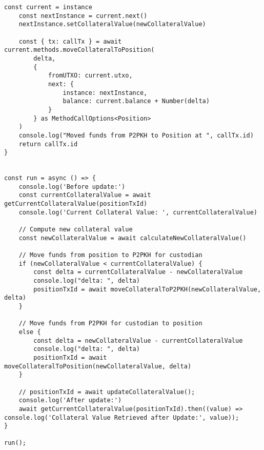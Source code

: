 \begin{lstlisting}[style=htmlcssjs, caption=Moving funds beteween Collateral Position and Parties' Balances based on updated collateral valuation]
    const current = instance
    const nextInstance = current.next()
    nextInstance.setCollateralValue(newCollateralValue)

    const { tx: callTx } = await current.methods.moveCollateralToPosition(
        delta,
        {
            fromUTXO: current.utxo,
            next: {
                instance: nextInstance,
                balance: current.balance + Number(delta)
            }
        } as MethodCallOptions<Position>
    )
    console.log("Moved funds from P2PKH to Position at ", callTx.id)
    return callTx.id
}


const run = async () => {
    console.log('Before update:')
    const currentCollateralValue = await getCurrentCollateralValue(positionTxId)
    console.log('Current Collateral Value: ', currentCollateralValue)

    // Compute new collateral value
    const newCollateralValue = await calculateNewCollateralValue()

    // Move funds from position to P2PKH for custodian
    if (newCollateralValue < currentCollateralValue) {
        const delta = currentCollateralValue - newCollateralValue
        console.log("delta: ", delta)
        positionTxId = await moveCollateralToP2PKH(newCollateralValue, delta)
    }
    
    // Move funds from P2PKH for custodian to position
    else {
        const delta = newCollateralValue - currentCollateralValue
        console.log("delta: ", delta)
        positionTxId = await moveCollateralToPosition(newCollateralValue, delta)
    }

    // positionTxId = await updateCollateralValue();
    console.log('After update:')
    await getCurrentCollateralValue(positionTxId).then((value) => console.log('Collateral Value Retrieved after Update:', value));
}

run();





\end{lstlisting}